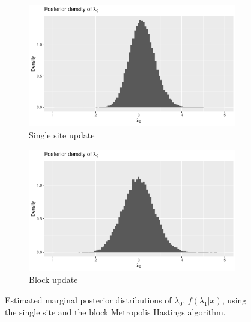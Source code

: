 \begin{figure}[H]
    \centering
    \begin{subfigure}[b]{0.49\textwidth}
        \centering
        \includegraphics[width = \textwidth]{Images/post_lambda_0_single.pdf}
        \caption{Single site update}
        \label{fig:post_lambda_0_single}
    \end{subfigure}
    \begin{subfigure}[b]{0.49\textwidth}
        \centering
        \includegraphics[width = \textwidth]{Images/post_lambda_0_block.pdf}
        \caption{Block update}
        \label{fig:post_lambda_0_block}
    \end{subfigure}
     \caption{Estimated marginal posterior distributions of $\lambda_0$, $f(\lambda_1|x)$, using the single site and the block Metropolis Hastings algorithm.}
    \label{fig:post_lam0}
\end{figure}


